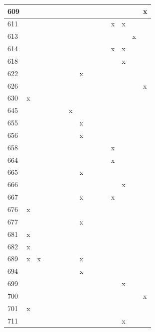 \begin{landscape}
\begin{longtable}{|p{0.2in}|p{0.3in}|p{0.41in}|p{0.4in}|p{0.3in}|p{0.31in}|p{0.3in}|p{0.3in}|p{0.375in}|p{0.3in}|p{0.3in}|p{0.35in}|p{0.35in}|p{0.4in}|p{0.3in}|}
   609 &  &  &  &  &  &  &  &  &  &  &  &  &  & x \\  \hline
   611 &  &  &  &  &  &  &  &  &  &  & x & x &  &  \\  \hline
   613 &  &  &  &  &  &  &  &  &  &  &  &  & x &  \\  \hline
   614 &  &  &  &  &  &  &  &  &  &  & x & x &  &  \\  \hline
   618 &  &  &  &  &  &  &  &  &  &  &  & x &  &  \\  \hline
   622 &  &  &  &  &  &  & x &  &  &  &  &  &  &  \\  \hline
   626 &  &  &  &  &  &  &  &   &   &   &  &  &  & x \\  \hline
   630 & x &  &  &  &  &  &  &  &  &  &  &  &  &  \\  \hline
   645 &  &  &  &  &  & x &  &  &  &  &  &  &  &  \\  \hline
   655 &  &  &  &  &  &  & x &  &  &  &  &  &  &  \\  \hline
   656 &  &  &  &  &  &  & x &  &  &  &  &  &  &  \\  \hline
   658 &  &  &  &  &  &  &  &  &  &  & x &  &  &  \\  \hline
   664 &  &  &  &  &  &  &  &  &  &  & x &  &  &  \\  \hline
   665 &  &  &  &  &  &  & x &  &  &  &  &  &  &  \\  \hline
   666 &  &  &  &  &  &  &  &  &  &  &  & x &  &  \\  \hline
   667 &  &  &  &  &  &  & x &  &  &  & x &  &  &   \\  \hline
   676 & x &  &  &  &  &  &  &  &  &  &  &  &  &  \\  \hline
   677 &  &  &  &  &  &  & x &  &  &  &  &  &  &  \\  \hline
   681 & x &  &  &  &  &  &  &  &  &  &  &  &  &  \\  \hline
   682 & x &  &  &  &   &   &   &   &   &   &   &   &  &   \\  \hline
   689 & x & x &  &  &  &  & x &  &  &  &  &  &  &  \\  \hline
   694 &  &  &  &  &  &  & x &  &  &  &  &  &  &  \\  \hline
   699 &  &  &  &  &  &  &  &  &  &  &  & x &  &  \\  \hline
   700 &  &  &  &  &  &  &  &   &   &   &  &  &  & x \\  \hline
   701 & x &  &  &  &  &  &  &  &  &  &  &  &  &  \\  \hline
   711 &  &  &  &  &  &  &  &  &  &  &  & x &  &  \\  \hline

\end{longtable}
\end{landscape}
